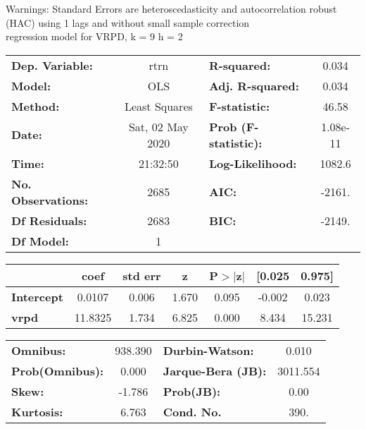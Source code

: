 Warnings: \newline
 [1] Standard Errors are heteroscedasticity and autocorrelation robust (HAC) using 1 lags and without small sample correction\\ 

regression model for VRPD, k = 9 h = 2\begin{center}
\begin{tabular}{lclc}
\toprule
\textbf{Dep. Variable:}    &       rtrn       & \textbf{  R-squared:         } &     0.034   \\
\textbf{Model:}            &       OLS        & \textbf{  Adj. R-squared:    } &     0.034   \\
\textbf{Method:}           &  Least Squares   & \textbf{  F-statistic:       } &     46.58   \\
\textbf{Date:}             & Sat, 02 May 2020 & \textbf{  Prob (F-statistic):} &  1.08e-11   \\
\textbf{Time:}             &     21:32:50     & \textbf{  Log-Likelihood:    } &    1082.6   \\
\textbf{No. Observations:} &        2685      & \textbf{  AIC:               } &    -2161.   \\
\textbf{Df Residuals:}     &        2683      & \textbf{  BIC:               } &    -2149.   \\
\textbf{Df Model:}         &           1      & \textbf{                     } &             \\
\bottomrule
\end{tabular}
\begin{tabular}{lcccccc}
                   & \textbf{coef} & \textbf{std err} & \textbf{z} & \textbf{P$> |$z$|$} & \textbf{[0.025} & \textbf{0.975]}  \\
\midrule
\textbf{Intercept} &       0.0107  &        0.006     &     1.670  &         0.095        &       -0.002    &        0.023     \\
\textbf{vrpd}      &      11.8325  &        1.734     &     6.825  &         0.000        &        8.434    &       15.231     \\
\bottomrule
\end{tabular}
\begin{tabular}{lclc}
\textbf{Omnibus:}       & 938.390 & \textbf{  Durbin-Watson:     } &    0.010  \\
\textbf{Prob(Omnibus):} &   0.000 & \textbf{  Jarque-Bera (JB):  } & 3011.554  \\
\textbf{Skew:}          &  -1.786 & \textbf{  Prob(JB):          } &     0.00  \\
\textbf{Kurtosis:}      &   6.763 & \textbf{  Cond. No.          } &     390.  \\
\bottomrule
\end{tabular}
\end{center}

